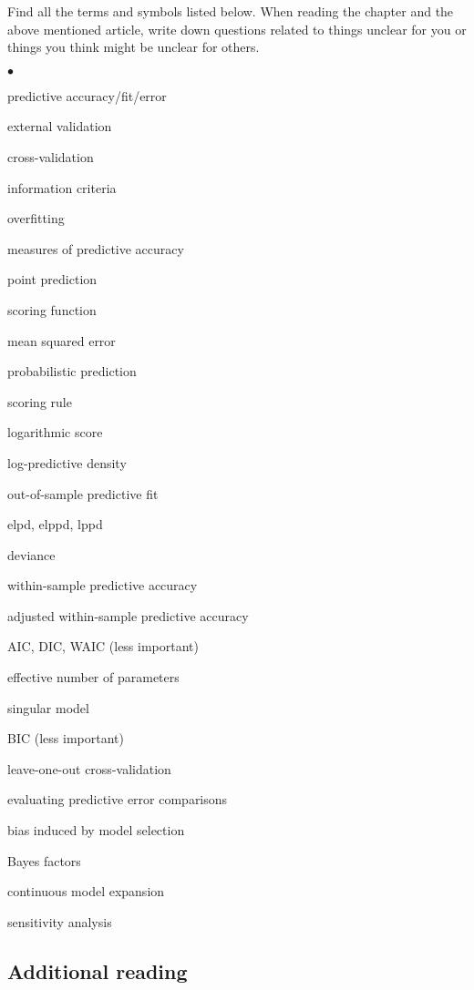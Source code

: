 \documentclass[a4paper,11pt,english]{article}
\begin{document}
\noindent
Find all the terms and symbols listed below. When reading the chapter
and the above mentioned article, write down questions related to
things unclear for you or things you think might be unclear for
others.
\begin{list}{$\bullet$}{\parsep=0pt\itemsep=2pt}
\item predictive accuracy/fit/error
\item external validation
\item cross-validation
\item information criteria
\item overfitting
\item measures of predictive accuracy
\item point prediction
\item scoring function
\item mean squared error
\item probabilistic prediction
\item scoring rule
\item logarithmic score
\item log-predictive density
\item out-of-sample predictive fit
\item elpd, elppd, lppd
\item deviance
\item within-sample predictive accuracy
\item adjusted within-sample predictive accuracy
\item AIC, DIC, WAIC (less important)
\item effective number of parameters
\item singular model
\item BIC (less important)
\item leave-one-out cross-validation
\item evaluating predictive error comparisons
\item bias induced by model selection
\item Bayes factors
\item continuous model expansion
\item sensitivity analysis
\end{list}

\subsection*{Additional reading}
\end{document}
